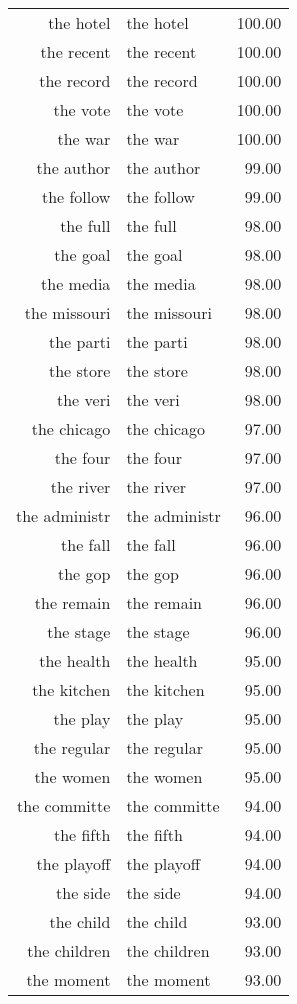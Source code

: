 \begin{table}[ht]
\begin{tabular}{rlr}
  the hotel & the hotel & 100.00 \\ 
  the recent & the recent & 100.00 \\ 
  the record & the record & 100.00 \\ 
  the vote & the vote & 100.00 \\ 
  the war & the war & 100.00 \\ 
  the author & the author & 99.00 \\ 
  the follow & the follow & 99.00 \\ 
  the full & the full & 98.00 \\ 
  the goal & the goal & 98.00 \\ 
  the media & the media & 98.00 \\ 
  the missouri & the missouri & 98.00 \\ 
  the parti & the parti & 98.00 \\ 
  the store & the store & 98.00 \\ 
  the veri & the veri & 98.00 \\ 
  the chicago & the chicago & 97.00 \\ 
  the four & the four & 97.00 \\ 
  the river & the river & 97.00 \\ 
  the administr & the administr & 96.00 \\ 
  the fall & the fall & 96.00 \\ 
  the gop & the gop & 96.00 \\ 
  the remain & the remain & 96.00 \\ 
  the stage & the stage & 96.00 \\ 
  the health & the health & 95.00 \\ 
  the kitchen & the kitchen & 95.00 \\ 
  the play & the play & 95.00 \\ 
  the regular & the regular & 95.00 \\ 
  the women & the women & 95.00 \\ 
  the committe & the committe & 94.00 \\ 
  the fifth & the fifth & 94.00 \\ 
  the playoff & the playoff & 94.00 \\ 
  the side & the side & 94.00 \\ 
  the child & the child & 93.00 \\ 
  the children & the children & 93.00 \\ 
  the moment & the moment & 93.00 \\ 

\end{tabular}
\end{table}
